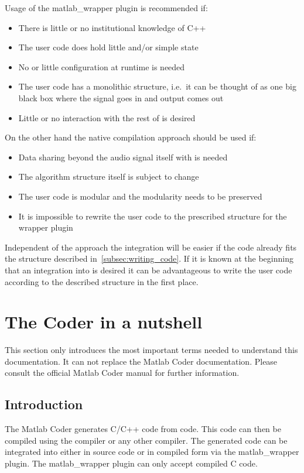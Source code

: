 \documentclass[11pt,a4paper,twoside]{article}
\newcommand{\+}{\discretionary{\mbox{\scriptsize$\hookleftarrow$}}{}{}}
\begin{document}
Usage of the matlab\_wrapper plugin is recommended if:
\begin{itemize}
\item There is little or no institutional knowledge of C++
\item The user code does hold little and/or simple state  
\item No or little configuration at runtime is needed
\item The user code has a monolithic structure, i.e.\ it can be thought of as
  one big black box where the signal goes in and output comes out
\item Little or no interaction with the rest of \mha{} is desired
\end{itemize}
On the other hand the native compilation approach should be used if:
\begin{itemize}
\item Data sharing beyond the audio signal itself with \mha{} is needed
\item The algorithm structure itself is subject to change
\item The user code is modular and the modularity needs to be preserved
\item It is impossible to rewrite the user code to the prescribed structure for
  the wrapper plugin
\end{itemize}
Independent of the approach the integration will be easier if the code already fits the
structure described in~\ref{subsec:writing_code}. If it is known at the beginning
that an integration into \mha{} is desired it can be advantageous to write the user
code according to the described structure in the first place.

\section{The \Matlab{} Coder in a nutshell}
This section only introduces the most important terms needed to understand this
documentation. It can not replace the Matlab Coder documentation.
Please consult the official Matlab Coder manual for further information.

\subsection*{Introduction}
The Matlab Coder generates C/C++ code from \Matlab{} code. This code can then be
compiled using the \Matlab{} compiler or any other compiler. The generated code
can be integrated into \mha{} either in source code or in compiled form via the
matlab\_wrapper plugin. The matlab\_wrapper plugin can only accept compiled C code.
\end{document}
